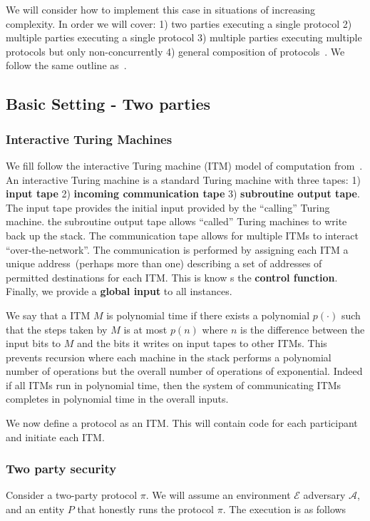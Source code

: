 \documentclass{article}
\begin{document}
We will consider how to implement this case in situations of increasing complexity.  In order we will cover: 1) two parties executing a single protocol 2) multiple parties executing a single protocol 3) multiple parties executing multiple protocols but only non-concurrently 4) general composition of protocols~\cite{canettiUC}.  We follow the same outline as~\cite{canettiTutorial}.

\subsection{Basic Setting - Two parties}
\subsubsection{Interactive Turing Machines}
We fill follow the interactive Turing machine (ITM) model of computation from~\cite{goldwasserMR85}.  An interactive Turing machine is a standard Turing machine with three tapes: 1) \textbf{input tape} 2) \textbf{incoming communication tape} 3) \textbf{subroutine output tape}.  The input tape provides the initial input provided by the ``calling'' Turing machine.  the subroutine output tape allows ``called'' Turing machines to write back up the stack.  The communication tape allows for multiple ITMs to interact ``over-the-network''.  The communication is performed by assigning each ITM a unique address~(perhaps more than one) describing a set of addresses of permitted destinations for each ITM.  This is know s the \textbf{control function}.  Finally, we provide a \textbf{global input} to all instances.

We say that a ITM $M$ is polynomial time if there exists a polynomial $p(\cdot)$ such that the steps taken by $M$ is at most $p(n)$ where $n$ is the difference between the input bits to $M$ and the bits it writes on input tapes to other ITMs.  This prevents recursion where each machine in the stack performs a polynomial number of operations but the overall number of operations of exponential.  Indeed if all ITMs run in polynomial time, then the system of communicating ITMs completes in polynomial time in the overall inputs.

We now define a protocol as an ITM.  This will contain code for each participant and initiate each ITM.

\subsubsection{Two party security}
Consider a two-party protocol $\pi$.  We will assume an environment $\mathcal{E}$ adversary $\mathcal{A}$, and an entity $P$ that honestly runs the protocol $\pi$.  The execution is as follows
\end{document}
